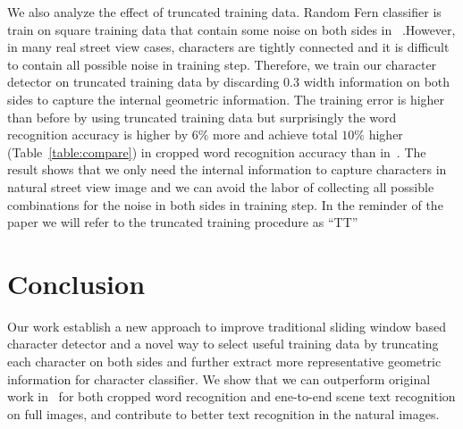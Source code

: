 \documentclass[10pt,twocolumn,letterpaper]{article}
\begin{document}
We also analyze the effect of truncated training data. Random Fern classifier is train on square training data that contain some noise on both sides in~\cite{417} .However, in many real street view cases, characters are tightly connected and it is difficult to contain all possible noise in training step. Therefore, we train our character detector on truncated training data by discarding $0.3$ width information on both sides to capture the internal geometric information. The training error is higher than before by using truncated training data but surprisingly the word recognition accuracy is higher by $6\%$ more and achieve total $10\%$ higher (Table~\ref{table:compare}) in cropped word recognition accuracy than in~\cite{417}. The result shows that we only need the internal information to capture characters in natural street view image and we can avoid the labor of collecting all possible combinations for the noise in both sides in training step. In the reminder of the paper we will refer to the truncated training procedure as ``TT''

\section{Conclusion}

Our work establish a new approach to improve traditional sliding window based character detector and a novel way to select useful training data by truncating each character on both sides and further extract more representative geometric information for character classifier. We show that we can outperform original work in~\cite{417} for both cropped word recognition and ene-to-end scene text recognition on full images, and contribute to better text recognition in the natural images.
\end{document}
